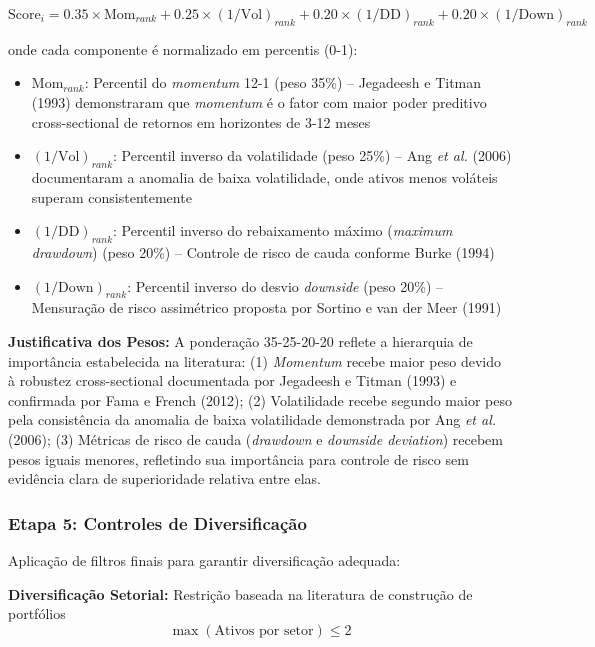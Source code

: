\begin{equation}
\text{Score}_i = 0.35 \times \text{Mom}_{rank} + 0.25 \times (1/\text{Vol})_{rank} + 0.20 \times (1/\text{DD})_{rank} + 0.20 \times (1/\text{Down})_{rank}
\end{equation}

onde cada componente é normalizado em percentis (0-1):
\begin{itemize}
    \item $\text{Mom}_{rank}$: Percentil do \textit{momentum} 12-1 (peso 35\%) -- Jegadeesh e Titman (1993) demonstraram que \textit{momentum} é o fator com maior poder preditivo cross-sectional de retornos em horizontes de 3-12 meses
    \item $(1/\text{Vol})_{rank}$: Percentil inverso da volatilidade (peso 25\%) -- Ang \textit{et al.} (2006) documentaram a anomalia de baixa volatilidade, onde ativos menos voláteis superam consistentemente
    \item $(1/\text{DD})_{rank}$: Percentil inverso do rebaixamento máximo (\textit{maximum drawdown}) (peso 20\%) -- Controle de risco de cauda conforme Burke (1994)
    \item $(1/\text{Down})_{rank}$: Percentil inverso do desvio \textit{downside} (peso 20\%) -- Mensuração de risco assimétrico proposta por Sortino e van der Meer (1991)
\end{itemize}

\textbf{Justificativa dos Pesos:} A ponderação 35-25-20-20 reflete a hierarquia de importância estabelecida na literatura: (1) \textit{Momentum} recebe maior peso devido à robustez cross-sectional documentada por Jegadeesh e Titman (1993) e confirmada por Fama e French (2012); (2) Volatilidade recebe segundo maior peso pela consistência da anomalia de baixa volatilidade demonstrada por Ang \textit{et al.} (2006); (3) Métricas de risco de cauda (\textit{drawdown} e \textit{downside deviation}) recebem pesos iguais menores, refletindo sua importância para controle de risco sem evidência clara de superioridade relativa entre elas.

\subsubsection{Etapa 5: Controles de Diversificação}

Aplicação de filtros finais para garantir diversificação adequada:

\textbf{Diversificação Setorial:} Restrição baseada na literatura de construção de portfólios
\begin{equation}
\max(\text{Ativos por setor}) \leq 2
\end{equation}

